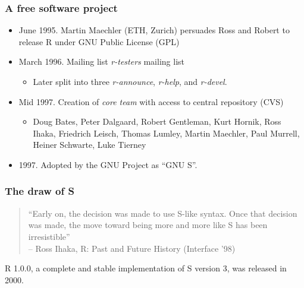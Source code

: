 \documentclass[svgnames, aspectratio=169]{beamer}
\begin{document}
\begin{frame}
  \frametitle{A free software project}

  \begin{itemize}
  \item June 1995. Martin Maechler (ETH, Zurich) persuades Ross and
    Robert to release R under GNU Public License (GPL)
  \item March 1996. Mailing list {\em r-testers} mailing list
    \begin{itemize}
    \item Later split into three {\em r-announce}, {\em r-help}, and
      {\em r-devel}.
    \end{itemize}
  \item Mid 1997. Creation of {\em core team} with access to central
    repository (CVS)
    \begin{itemize}
    \item {\small Doug Bates, Peter Dalgaard, Robert Gentleman, Kurt
      Hornik, Ross Ihaka, Friedrich Leisch, Thomas Lumley, Martin
      Maechler, Paul Murrell, Heiner Schwarte, Luke Tierney}
    \end{itemize}
  \item 1997. Adopted by the GNU Project as ``GNU S''. 
  \end{itemize}
\end{frame}
  
\begin{frame}
  \frametitle{The draw of S}

  \begin{quote}
    ``Early on, the decision was made to use S-like syntax. Once that
    decision was made, the move toward being more and more like S has
    been irresistible''\\
    -- Ross Ihaka, R: Past and Future History
    (Interface '98)
  \end{quote}

  R 1.0.0, a complete and stable implementation of S version 3, was
  released in 2000.

\end{frame}
\end{document}
